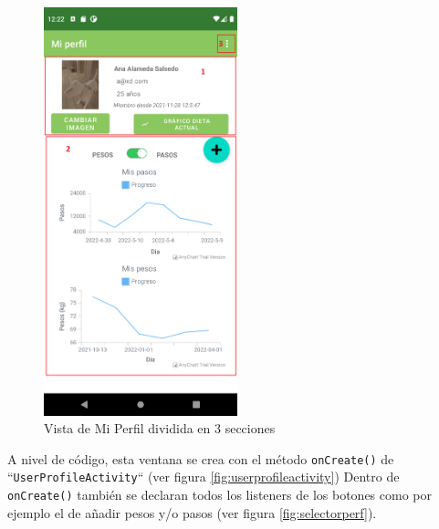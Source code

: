 \begin{figure}[H]
    \centering
    \includegraphics[width=0.5\textwidth]{Images/Capitulo7/perfedit.png}
        \caption{Vista de Mi Perfil dividida en 3 secciones}
    \label{fig:perfedit}
\end{figure}

A nivel de código, esta ventana se crea con el método \texttt{onCreate()} de ``\texttt{UserProfileActivity}`` (ver figura \ref{fig:userprofileactivity}) Dentro de \texttt{onCreate()} también se declaran todos los listeners de los botones como por ejemplo el de añadir pesos y/o pasos (ver figura \ref{fig:selectorperf}).


